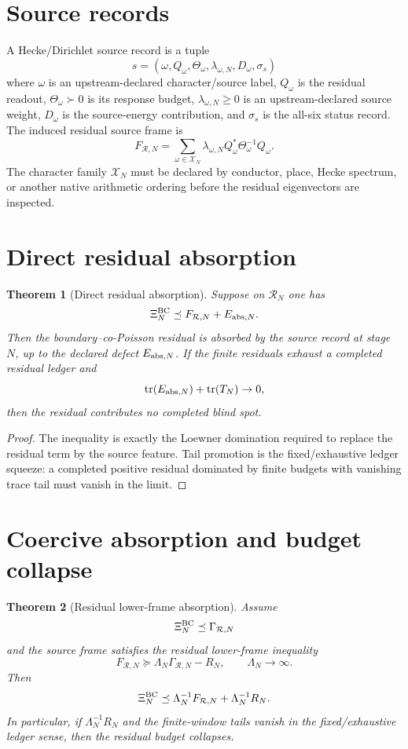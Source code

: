 \documentclass[11pt]{article}
\newtheorem{theorem}{Theorem}
\begin{document}
\section{Source records}
A Hecke/Dirichlet source record is a tuple
\[
  s=(\omega,Q_\omega,\Theta_\omega,\lambda_{\omega,N},D_\omega,\sigma_s)
\]
where $\omega$ is an upstream-declared character/source label, $Q_\omega$ is the residual readout, $\Theta_\omega\succ0$ is its response budget, $\lambda_{\omega,N}\ge0$ is an upstream-declared source weight, $D_\omega$ is the source-energy contribution, and $\sigma_s$ is the all-six status record.
The induced residual source frame is
\[
  F_{\mathcal R,N}=\sum_{\omega\in\mathcal X_N}\lambda_{\omega,N}Q_\omega^*\Theta_\omega^{-1}Q_\omega.
\]
The character family $\mathcal X_N$ must be declared by conductor, place, Hecke spectrum, or another native arithmetic ordering before the residual eigenvectors are inspected.

\section{Direct residual absorption}
\begin{theorem}[Direct residual absorption]
Suppose on $\mathcal R_N$ one has
\[
  \Xi^{\rm BC}_N\preceq F_{\mathcal R,N}+E_{{\rm abs},N}.
\]
Then the boundary--co-Poisson residual is absorbed by the source record at stage $N$, up to the declared defect $E_{{\rm abs},N}$.  If the finite residuals exhaust a completed residual ledger and
\[
  \operatorname{tr}(E_{{\rm abs},N})+\operatorname{tr}(T_N)\to0,
\]
then the residual contributes no completed blind spot.
\end{theorem}

\begin{proof}
The inequality is exactly the Loewner domination required to replace the residual term by the source feature.  Tail promotion is the fixed/exhaustive ledger squeeze: a completed positive residual dominated by finite budgets with vanishing trace tail must vanish in the limit.
\end{proof}

\section{Coercive absorption and budget collapse}
\begin{theorem}[Residual lower-frame absorption]
Assume
\[
  \Xi^{\rm BC}_N\preceq\Gamma_{\mathcal R,N}
\]
and the source frame satisfies the residual lower-frame inequality
\[
  F_{\mathcal R,N}\succeq \Lambda_N\Gamma_{\mathcal R,N}-R_N,
  \qquad \Lambda_N\to\infty.
\]
Then
\[
  \Xi^{\rm BC}_N\preceq \Lambda_N^{-1}F_{\mathcal R,N}+\Lambda_N^{-1}R_N.
\]
In particular, if $\Lambda_N^{-1}R_N$ and the finite-window tails vanish in the fixed/exhaustive ledger sense, then the residual budget collapses.
\end{theorem}
\end{document}
